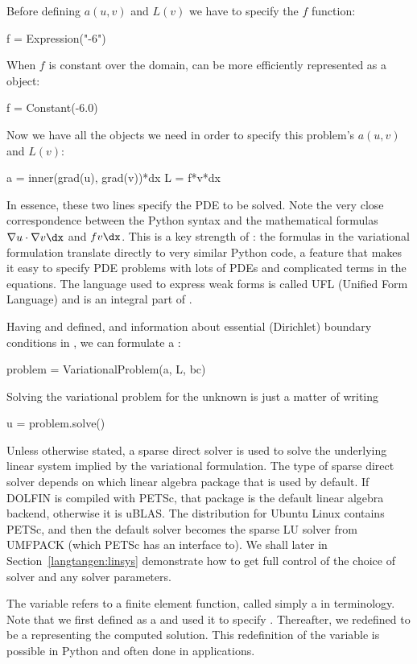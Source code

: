 Before defining $a(u,v)$ and $L(v)$ we have to specify the $f$ function:
\begin{python}
f = Expression("-6")
\end{python}
When $f$ is constant over the domain,  can be more efficiently
represented as a  object:
\begin{python}
f = Constant(-6.0)
\end{python}
Now we have all the objects we need in order to specify this problem's
$a(u,v)$ and $L(v)$:
\begin{python}
a = inner(grad(u), grad(v))*dx
L = f*v*dx
\end{python}
In essence, these two lines specify the PDE to be solved.  Note the
very close correspondence between the Python syntax and the mathematical
formulas $\nabla u\cdot\nabla v\dx$ and $fv\dx$.  This is a key strength
of \fenics: the formulas in the variational formulation translate directly
to very similar Python code, a feature that makes it easy to specify
PDE problems with lots of PDEs and complicated terms in the equations.
The language used to express weak forms is called UFL (Unified Form
Language) and is an integral part of \fenics.

Having  and  defined, and information about essential
(Dirichlet) boundary conditions in , we can formulate a
:
\begin{python}
problem = VariationalProblem(a, L, bc)
\end{python}
Solving the variational problem for the unknown  is just a matter
of writing
\begin{python}
u = problem.solve()
\end{python}
Unless otherwise stated, a sparse direct solver is used to solve the
underlying linear system implied by the variational formulation. The type
of sparse direct solver depends on which linear algebra package that is
used by default. If DOLFIN is compiled with PETSc, that package is the
default linear algebra backend, otherwise it is uBLAS.  The \fenics{}
distribution for Ubuntu Linux contains PETSc, and then the default solver
becomes the sparse LU solver from UMFPACK (which PETSc has an interface
to). We shall later in Section~\ref{langtangen:linsys} demonstrate how
to get full control of the choice of solver and any solver parameters.

The  variable refers to a finite element function, called
simply a  in \fenics{} terminology.  Note that we first
defined  as a  and used it to specify .
Thereafter, we redefined  to be a  representing the
computed solution. This redefinition of the variable  is possible
in Python and often done in \fenics{} applications.


